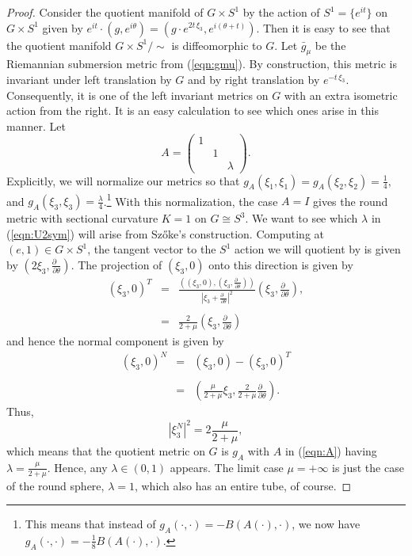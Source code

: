 \documentclass[12pt,reqno]{amsart}\usepackage{amssymb,amsmath,amscd,epsfig,amsthm,enumerate,import,eufrak}
\theoremstyle{definition}
\theoremstyle{remark}
\numberwithin{equation}{section}
\theoremstyle{plain}
\theoremstyle{definition}
\def \vs {\vskip 2mm}
\def \dbdth {\frac{\partial \;\;}{\partial \theta}}
\theoremstyle{remark}
\numberwithin{theorem}{section}
\begin{document}
\begin{proof}
Consider the quotient manifold of $G\times S^1$ by the action of $S^1 = \{e^{i t}\}$ on $G\times S^1$ given by $e^{i t} \cdot (g, e^{i \theta}) = (g\cdot e^{2 t\, \xi_3}, e^{i(\theta + t)}).$ Then it is easy to see that the quotient manifold $G\times S^1/\sim$ is diffeomorphic to $G$. Let $\bar{g}_{\mu}$ be the Riemannian submersion metric from (\ref{eqn:gmu}). By construction, this metric is invariant under left translation by $G$ and by right translation by $e^{- t \, \xi_3}$. Consequently, it is one of the left invariant metrics on  $G$ with an extra isometric action from the right. It is an easy calculation to see which ones arise in this manner. Let 
%
\begin{equation} 
	\label{eqn:A}
		A = \left(\begin{array}{ccc} 1 & & \\ & 1 & \\ & & \lambda \end{array}\right).
\end{equation}
%
Explicitly, we will normalize our metrics so that $g_A(\xi_1, \xi_1) = g_A(\xi_2, \xi_2) = \frac14,$ and $g_A(\xi_3, \xi_3) = \frac{\lambda}4$.\footnote{This means that instead of $g_A(\cdot,\cdot) = -B(A(\cdot), \cdot)$, we now have $g_A(\cdot, \cdot) = -\frac18 B(A(\cdot), \cdot)$.} With this normalization, the case $A = I$ gives the round metric with sectional curvature $K = 1$ on $G \cong S^3$.
\vs
%
We want to see which $\lambda$ in (\ref{eqn:U2sym}) will arise from Sz\H{o}ke's construction. Computing at $(e,1) \in G\times S^1$, the tangent vector to the $S^1$ action we will quotient by is given by $(2\xi_3, \frac{\partial \;\;}{\partial \theta})$. The projection of $(\xi_3, 0)$ onto this direction is given by
%
\begin{equation} \label{eqn:Tproj}
	\begin{array}{rcl}
	(\xi_3,0)^T & = & \frac{((\xi_3, 0), (\xi_3, \frac{\partial \;\;}{\partial \theta}))}{|\xi_3 + \frac{\partial \;\;}{\partial \theta}|^2} (\xi_3, \frac{\partial \;\;}{\partial \theta}), \\
	& & \\
	& = & \frac2{2+\mu} (\xi_3, \dbdth)
	\end{array}
\end{equation}
%
and hence the normal component is given by 
%
\begin{equation} 
	\label{eqn:Nproj}
	\begin{array}{rcl}
		(\xi_3,0)^N & = & (\xi_3,0) - (\xi_3,0)^T \\
		&	&	\\
		& = & (\frac{\mu}{2+\mu} \xi_3, \frac2{2+\mu} \dbdth). 	
	\end{array}
\end{equation}
%
Thus, 
%
\[
	|\xi_3^N|^2 = 2 \frac{\mu}{2+\mu},
\]
%
which means that the quotient metric on $G$ is $g_A$ with $A$ in (\ref{eqn:A}) having $\lambda = \frac{\mu}{2 + \mu}.$ Hence, any $\lambda \in (0, 1)$ appears. The limit case $\mu = +\infty$ is just the case of the round sphere, $\lambda = 1$, which also has an entire tube, of course.
%
\end{proof}
\end{document}
